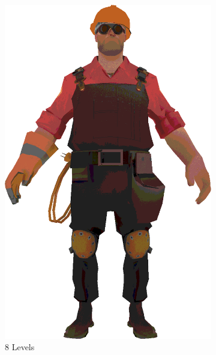 \begin{figure}[h]
\begin{subfigure}[b]{0.14\textwidth}
        \includegraphics[width=\textwidth]{img/textures/CelShadeTexture8.png}
        \caption{8 Levels}
        \label{fig:CelShadeTexture8}
    \end{subfigure}
    ~
    \begin{subfigure}[b]{0.16\textwidth}

\end{subfigure}
\end{figure}
